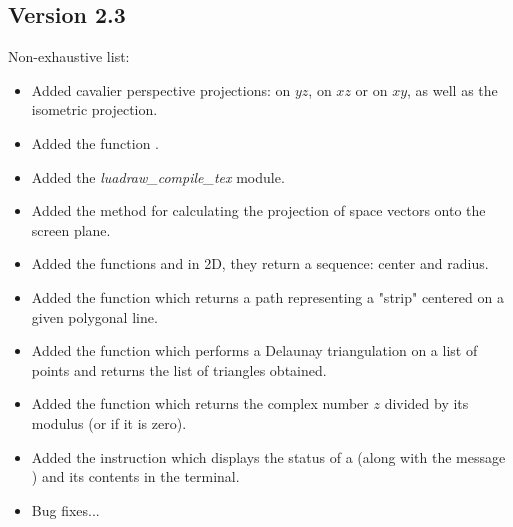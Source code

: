 \subsection{Version 2.3}
Non-exhaustive list:
\begin{itemize}
\item Added cavalier perspective projections: on $yz$, on $xz$ or on $xy$, as well as the isometric projection.
\item Added the function .
\item Added the \emph{luadraw\_compile\_tex} module.
\item Added the  method for calculating the projection of space vectors onto the screen plane.
\item Added the functions  and  in 2D, they return a sequence: center and radius.
\item Added the function  which returns a path representing a "strip" centered on a given polygonal line.
\item Added the function  which performs a Delaunay triangulation on a list of points and returns the list of triangles obtained.
\item Added the function  which returns the complex number $z$ divided by its modulus (or \nil if it is zero).
\item Added the instruction  which displays the status of a  (along with the message ) and its contents in the terminal.
\item Bug fixes...
\end{itemize}

